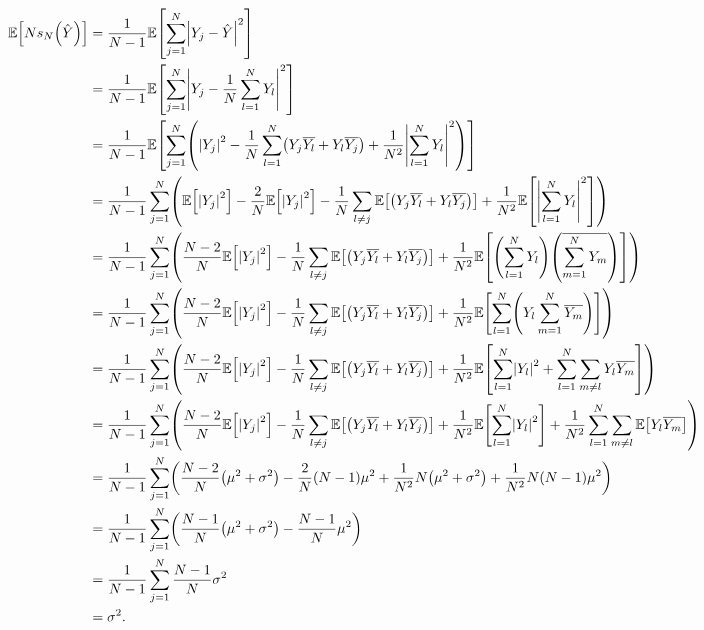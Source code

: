 \begin{align*}
  \EXP{N\unbiased{\Yhat}{N}} &= \frac1{N-1} \EXP{\sum_{j=1}^N \abs{\Yj - \Yhat}^2}\\
  &= \frac1{N-1}\EXP{\sum_{j=1}^N \abs{\Yj  - \frac1{N} \sum_{l=1}^N \Yl}^2}\\
  & = \frac1{N-1} \EXP{\sum_{j=1}^N\mleft(\abs{\Yj}^2 - \frac1N \sum_{l=1}^N \mleft(\Yj \Ylbar + \Yl\Yjbar\mright) + \frac1{N^2} \abs{\sum_{l=1}^N  \Yl}^2\mright)}\\
  & = \frac1{N-1} \sum_{j=1}^N\mleft(\EXP{\abs{\Yj}^2} -\frac2N \EXP{\abs{\Yj}^2} -\frac1N \sum_{l\neq j} \EXP{\mleft(\Yj \Ylbar + \Yl\Yjbar\mright)} + \frac1{N^2}\EXP{ \abs{\sum_{l=1}^N  \Yl}^2}\mright)\\
  & = \frac1{N-1} \sum_{j=1}^N\mleft(\frac{N-2}N\EXP{\abs{\Yj}^2}-\frac1N \sum_{l\neq j} \EXP{\mleft(\Yj \Ylbar + \Yl\Yjbar\mright)} + \frac1{N^2}\EXP{ \mleft(\sum_{l=1}^N\Yl\mright)\mleft(\overline{\sum_{m=1}^N  \Ym}\mright)}\mright)\\
  & = \frac1{N-1} \sum_{j=1}^N\mleft(\frac{N-2}N\EXP{\abs{\Yj}^2}-\frac1N \sum_{l\neq j} \EXP{\mleft(\Yj \Ylbar + \Yl\Yjbar\mright)} + \frac1{N^2}\EXP{ \sum_{l=1}^N\mleft(\Yl\sum_{m=1}^N  \Ymbar\mright)}\mright)\\
  & = \frac1{N-1} \sum_{j=1}^N\mleft(\frac{N-2}N\EXP{\abs{\Yj}^2}-\frac1N \sum_{l\neq j} \EXP{\mleft(\Yj \Ylbar + \Yl\Yjbar\mright)} + \frac1{N^2}\EXP{ \sum_{l=1}^N\abs{\Yl}^2 + \sum_{l=1}^N \sum_{m\neq l} \Yl \Ymbar}\mright)\\
  & = \frac1{N-1} \sum_{j=1}^N\mleft(\frac{N-2}N\EXP{\abs{\Yj}^2}-\frac1N \sum_{l\neq j} \EXP{\mleft(\Yj \Ylbar + \Yl\Yjbar\mright)} + \frac1{N^2}\EXP{ \sum_{l=1}^N\abs{\Yl}^2} +\frac1{N^2} \sum_{l=1}^N \sum_{m\neq l} \EXP{\Yl \Ymbar}\mright)\\
  &= \frac1{N-1} \sum_{j=1}^N \mleft(\frac{N-2}N \mleft(\mu^2 + \sigma^2\mright) - \frac2N \mleft(N-1\mright) \mu^2 + \frac1{N^2} N \mleft(\mu^2 + \sigma^2\mright) + \frac1{N^2} N \mleft(N-1\mright) \mu^2\mright)\\
  &= \frac1{N-1} \sum_{j=1}^N \mleft( \frac{N-1}N \mleft(\mu^2 + \sigma^2\mright) - \frac{N-1}{N} \mu^2\mright)\\
  &= \frac1{N-1} \sum_{j=1}^N \frac{N-1}N \sigma^2\\
  &= \sigma^2.
  \end{align*}
\epf{}
